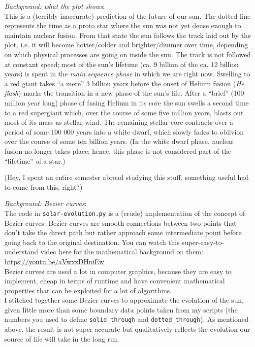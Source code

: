 \documentclass[
	english,
	fontsize=10pt,
	parskip=half,
	titlepage=true,
	DIV=12
]{scrartcl}
\newcommand*{\ie}{i.\;e. }
\begin{document}
\emph{Background: what the plot shows}:\\
This is a (terribly inaccurate) prediction of the future of our sun. The dotted line represents the time as a proto star where the sun was not yet dense enough to maintain nuclear fusion. From that state the sun follows the track laid out by the plot, \ie it will become hotter/colder and brighter/dimmer over time, depending on which physical processes are going on inside the sun. The track is not followed at constant speed; most of the sun's lifetime (ca. 9 billion of the ca. 12 billion years) is spent in the \emph{main sequence phase} in which we are right now. Swelling to a red giant takes \enquote{a mere} 3 billion years before the onset of Helium fusion (\emph{He flash}) marks the transition in a new phase of the sun's life. After a \enquote{brief} (100 million year long) phase of fusing Helium in its core the sun swells a second time to a red supergiant which, over the course of some five million years, blasts out most of its mass as stellar wind. The remaining stellar core contracts over a period of some 100 000 years into a white dwarf, which slowly fades to oblivion over the course of some ten billion years. (In the white dwarf phase, nuclear fusion no longer takes place; hence, this phase is not considered part of the \enquote{lifetime} of a star.)

(Hey, I spent an entire semester abroad studying this stuff, something useful had to come from this, right?)

\emph{Background: Bezier curves}:\\
The code in \texttt{solar-evolution.py} is a (crude) implementation of the concept of Bezier curves. Bezier curves are smooth connections between two points that don't take the direct path but rather approach some intermediate point before going back to the original destination. You can watch this super-easy-to-understand video here for the mathematical background on them: \url{https://youtu.be/aVwxzDHniEw}\\
Bezier curves are used a lot in computer graphics, because they are easy to implement, cheap in terms of runtime and have convenient mathematical properties that can be exploited for a lot of algorithms.\\
I stitched together some Bezier curves to approximate the evolution of the sun, given little more than some boundary data points taken from my scripts (the numbers you used to define \texttt{solid\_through} and \texttt{dotted\_through}). As mentioned above, the result is not super accurate but qualitatively reflects the evolution our source of life will take in the long run.
\end{document}
